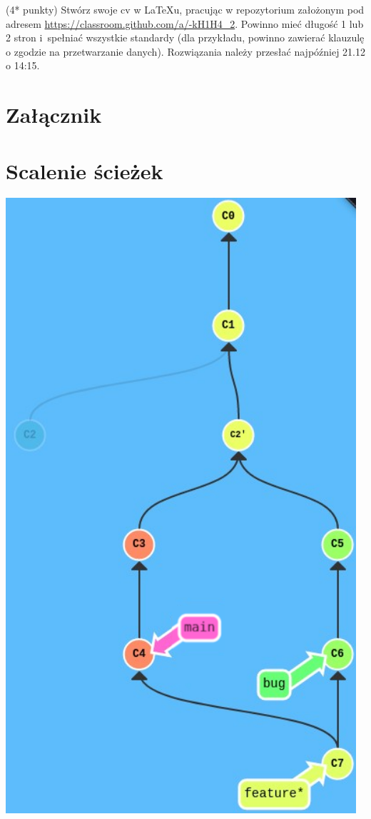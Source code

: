 \begin{zadanie}{(4* punkty)}
Stwórz swoje cv w \LaTeX{}u, pracując w repozytorium założonym pod adresem \url{https://classroom.github.com/a/-kH1H4_2}. Powinno mieć długość 1 lub 2 stron i~spełniać wszystkie standardy (dla przykładu, powinno zawierać klauzulę o zgodzie na przetwarzanie danych). Rozwiązania należy przesłać najpóźniej 21.12 o 14:15.
\end{zadanie}
\newpage
\section*{Załącznik}
\section{Scalenie ścieżek}
\includegraphics[scale=0.45]{pics/830.png}

